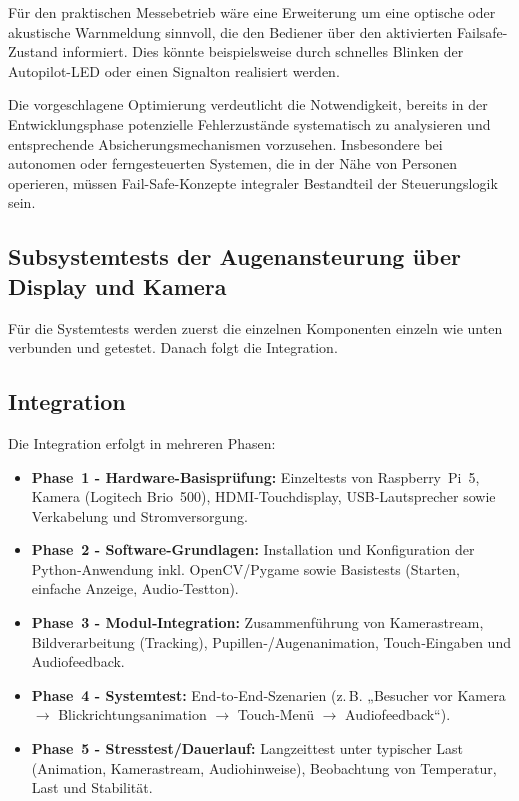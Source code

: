 Für den praktischen Messebetrieb wäre eine Erweiterung um eine optische oder akustische Warnmeldung sinnvoll, die den Bediener über den aktivierten Failsafe-Zustand informiert. Dies könnte beispielsweise durch schnelles Blinken der Autopilot-LED oder einen Signalton realisiert werden.

Die vorgeschlagene Optimierung verdeutlicht die Notwendigkeit, bereits in der Entwicklungsphase potenzielle Fehlerzustände systematisch zu analysieren und entsprechende Absicherungsmechanismen vorzusehen. Insbesondere bei autonomen oder ferngesteuerten Systemen, die in der Nähe von Personen operieren, müssen Fail-Safe-Konzepte integraler Bestandteil der Steuerungslogik sein.

\subsection{Subsystemtests der Augenansteurung über Display und Kamera}
\label{cha:Subsystemtests der Augenansteurung über Display und Kamera}
Für die Systemtests  werden zuerst die einzelnen Komponenten einzeln wie unten verbunden und getestet. Danach folgt die Integration.
\subsection{Integration}
\label{cha:Integration}

Die Integration erfolgt in mehreren Phasen:
\begin{itemize}
	\item \textbf{Phase~1 - Hardware-Basisprüfung:} Einzeltests von Raspberry~Pi~5, Kamera (Logitech Brio~500), HDMI‑Touchdisplay, USB‑Lautsprecher sowie Verkabelung und Stromversorgung.
	\item \textbf{Phase~2 - Software-Grundlagen:} Installation und Konfiguration der Python‑Anwendung inkl. OpenCV/Pygame sowie Basistests (Starten, einfache Anzeige, Audio‑Testton).
	\item \textbf{Phase~3 - Modul‑Integration:} Zusammenführung von Kamerastream, Bildverarbeitung (Tracking), Pupillen‑/Augenanimation, Touch‑Eingaben und Audiofeedback.
	\item \textbf{Phase~4 - Systemtest:} End‑to‑End‑Szenarien (z.\,B. „Besucher vor Kamera \(\rightarrow\) Blickrichtungsanimation \(\rightarrow\) Touch‑Menü \(\rightarrow\) Audiofeedback“).
	\item \textbf{Phase~5 - Stresstest/Dauerlauf:} Langzeittest unter typischer Last (Animation, Kamerastream, Audiohinweise), Beobachtung von Temperatur, Last und Stabilität.
\end{itemize}

